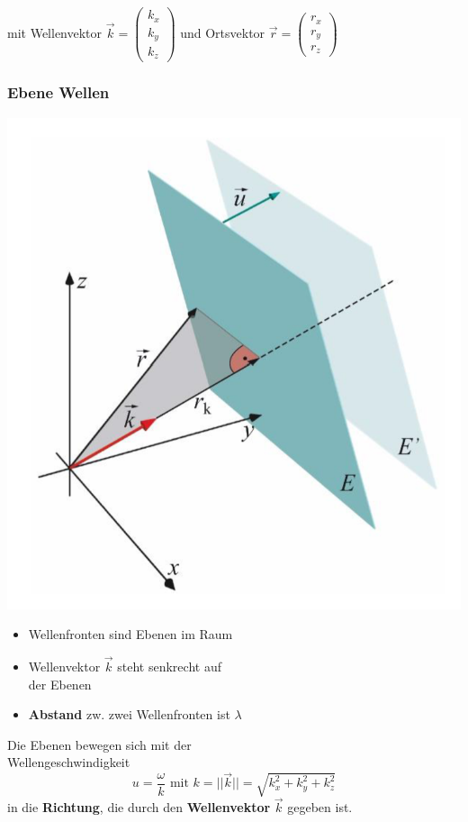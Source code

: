 mit Wellenvektor $\vec{k} = \begin{pmatrix} k_x \\ k_y \\ k_z  \end{pmatrix}$ und Ortsvektor $ \vec{r} = \begin{pmatrix} r_x \\ r_y \\ r_z  \end{pmatrix}$




\subsubsection{Ebene Wellen}

\begin{minipage}{0.3\linewidth}
\includegraphics[width=0.98\linewidth]{Bilder/Wellen-Optik/Ebene_Welle}
\end{minipage}
\hfill
\begin{minipage}{0.68\linewidth}

\begin{itemize}
	\item Wellenfronten sind Ebenen im Raum 
	\item Wellenvektor $\vec{k}$ steht senkrecht auf \\
		der Ebenen 
	\item \textbf{Abstand} zw. zwei Wellenfronten ist $\lambda$ 

\end{itemize}


Die Ebenen bewegen sich mit der \\
Wellengeschwindigkeit
$$ \boxed{ u = \frac{\omega}{k} \text{ mit } k = ||\vec{k}|| = \sqrt{k_x^2 + k_y^2 + k_z^2} }$$  in die \textbf{Richtung}, die durch den \textbf{Wellenvektor} $\vec{k}$ gegeben ist.
\end{minipage}




